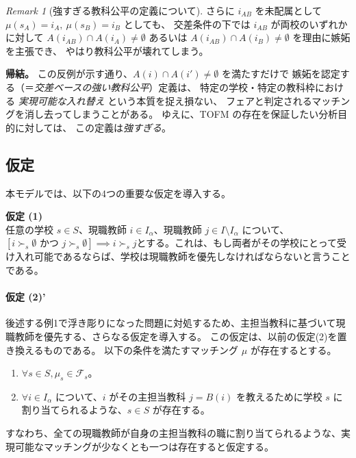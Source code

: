 \documentclass[12pt, a4paper]{article}
\theoremstyle{definition}
\theoremstyle{remark}
\newtheorem{remark}{Remark}
\theoremstyle{plain}
\begin{document}
\begin{remark}[強すぎる教科公平の定義について]
さらに $i_{AB}$ を未配属として $\mu(s_A)=i_A,\ \mu(s_B)=i_B$ としても、
交差条件の下では $i_{AB}$ が両校のいずれかに対して
$A(i_{AB})\cap A(i_A)\neq\emptyset$ あるいは
$A(i_{AB})\cap A(i_B)\neq\emptyset$ を理由に嫉妬を主張でき、
やはり教科公平が壊れてしまう。

\medskip
\noindent\textbf{帰結。}
この反例が示す通り、$A(i)\cap A(i')\neq\emptyset$ を満たすだけで
嫉妬を認定する（＝\emph{交差ベースの強い教科公平}）定義は、
特定の学校・特定の教科枠における \emph{実現可能な入れ替え} という本質を捉え損ない、
フェアと判定されるマッチングを消し去ってしまうことがある。
ゆえに、TOFM の存在を保証したい分析目的に対しては、
この定義は\emph{強すぎる}。
\end{remark}



\subsection{仮定}
本モデルでは、以下の4つの重要な仮定を導入する。


\vspace{0.5\baselineskip}
\noindent\textbf{仮定 (1)} \\
任意の学校 $s \in S$、現職教師 $i \in I_\alpha$、現職教師 $j \in I\setminus I_\alpha$ について、$[i \succ_s \emptyset \text{ かつ } j \succ_s \emptyset] \implies i \succ_s j$とする。これは、もし両者がその学校にとって受け入れ可能であるならば、学校は現職教師を優先しなければならないと言うことである。

\vspace{0.5\baselineskip}
\paragraph{\textbf{仮定 (2)'}}
後述する例1で浮き彫りになった問題に対処するため、主担当教科に基づいて現職教師を優先する、さらなる仮定を導入する。
この仮定は、以前の仮定(2)を置き換えるものである。
以下の条件を満たすマッチング $\mu$ が存在するとする。
\begin{enumerate}
    \item $\forall s \in S, \mu_s \in \mathcal{F}_s$。
    \item $\forall i \in I_\alpha$ について、$i$ がその主担当教科 $j=B(i)$ を教えるために学校 $s$ に割り当てられるような、$s \in S$ が存在する。
\end{enumerate}
すなわち、全ての現職教師が自身の主担当教科の職に割り当てられるような、実現可能なマッチングが少なくとも一つは存在すると仮定する。
\end{document}
